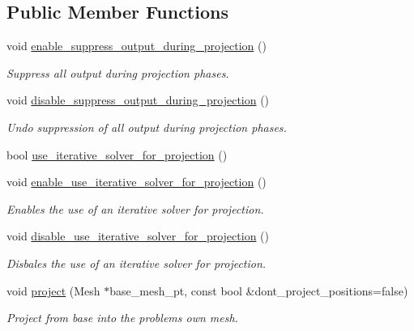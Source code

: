 \subsection*{Public Member Functions}
\begin{DoxyCompactItemize}
\item 
void \hyperlink{classoomph_1_1ProjectionProblem_a3706c034e47193038de20f3d40443a2c}{enable\+\_\+suppress\+\_\+output\+\_\+during\+\_\+projection} ()
\begin{DoxyCompactList}\small\item\em Suppress all output during projection phases. \end{DoxyCompactList}\item 
void \hyperlink{classoomph_1_1ProjectionProblem_ab9bb57b5e9241388b4f90b37e338c454}{disable\+\_\+suppress\+\_\+output\+\_\+during\+\_\+projection} ()
\begin{DoxyCompactList}\small\item\em Undo suppression of all output during projection phases. \end{DoxyCompactList}\item 
bool \hyperlink{classoomph_1_1ProjectionProblem_a5652035eda34f398652ede076dc085ae}{use\+\_\+iterative\+\_\+solver\+\_\+for\+\_\+projection} ()
\item 
void \hyperlink{classoomph_1_1ProjectionProblem_aefda55d76d58a951ef6714cbb998e358}{enable\+\_\+use\+\_\+iterative\+\_\+solver\+\_\+for\+\_\+projection} ()
\begin{DoxyCompactList}\small\item\em Enables the use of an iterative solver for projection. \end{DoxyCompactList}\item 
void \hyperlink{classoomph_1_1ProjectionProblem_aaf4b8fcb1f5f15cd95075a7da3e76cc5}{disable\+\_\+use\+\_\+iterative\+\_\+solver\+\_\+for\+\_\+projection} ()
\begin{DoxyCompactList}\small\item\em Disbales the use of an iterative solver for projection. \end{DoxyCompactList}\item 
void \hyperlink{classoomph_1_1ProjectionProblem_ad972f78212e515a03d1018996115265a}{project} (Mesh $\ast$base\+\_\+mesh\+\_\+pt, const bool \&dont\+\_\+project\+\_\+positions=false)
\begin{DoxyCompactList}\small\item\em Project from base into the problem\textquotesingle{}s own mesh. \end{DoxyCompactList}\end{DoxyCompactItemize}
